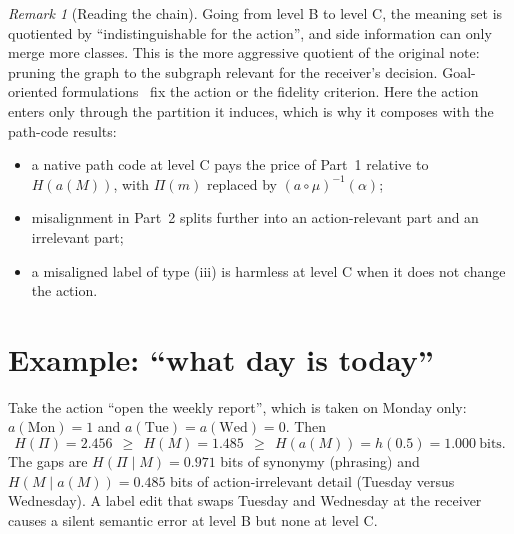 \documentclass[11pt]{article}
\theoremstyle{definition}
\theoremstyle{remark}
\newtheorem{remark}{Remark}
\newcommand{\Pset}{\Pi}
\begin{document}
\begin{remark}[Reading the chain]
Going from level B to level C, the meaning set is quotiented by ``indistinguishable for the action'', and side information can only merge more classes. This is the more aggressive quotient of the original note: pruning the graph to the subgraph relevant for the receiver's decision. Goal-oriented formulations~\cite{goldreich2012,stavrou2023} fix the action or the fidelity criterion. Here the action enters only through the partition it induces, which is why it composes with the path-code results:
\begin{itemize}
\item a native path code at level C pays the price of Part~1 relative to $H(a(M))$, with $\Pset(m)$ replaced by $(a\circ\mu)^{-1}(\alpha)$;
\item misalignment in Part~2 splits further into an action-relevant part and an irrelevant part;
\item a misaligned label of type (iii) is harmless at level C when it does not change the action.
\end{itemize}
\end{remark}

\section{Example: ``what day is today''}

Take the action ``open the weekly report'', which is taken on Monday only: $a(\text{Mon})=1$ and $a(\text{Tue})=a(\text{Wed})=0$. Then
\[
H(\Pi)=2.456\ \ \ge\ \ H(M)=1.485\ \ \ge\ \ H(a(M))=h(0.5)=1.000\ \text{bits}.
\]
The gaps are $H(\Pi\mid M)=0.971$ bits of synonymy (phrasing) and $H(M\mid a(M))=0.485$ bits of action-irrelevant detail (Tuesday versus Wednesday). A label edit that swaps Tuesday and Wednesday at the receiver causes a silent semantic error at level B but none at level C.
\end{document}
